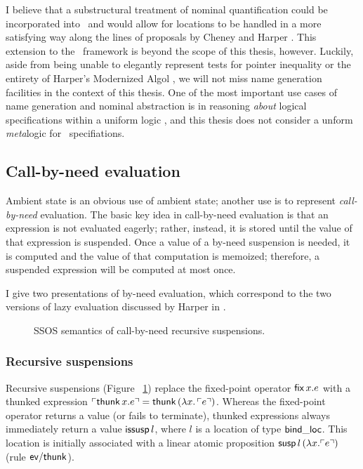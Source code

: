 I believe that a substructural treatment of nominal quantification
could be incorporated into \sls~and would allow for locations to be
handled in a more satisfying way along the lines of proposals by
Cheney and Harper \cite{cheney12dependent,harper12practical}. This
extension to the \sls~framework is beyond the scope of this thesis,
however. Luckily, aside from being unable to elegantly represent tests
for pointer inequality or the entirety of Harper's Modernized Algol
\cite[Chapter 35]{harper12practical}, we will not miss name generation
facilities in the context of this thesis. One of the most important
use cases of name generation and nominal abstraction is in reasoning
{\it about} logical specifications within a uniform logic
\cite{gacek11nominal}, and this thesis does not consider a unform {\it
  meta}logic for \sls~specifiations.

\subsection{Call-by-need evaluation}
\label{sec:call-by-need}

Ambient state is an obvious use of ambient state; another use is to
represent {\it call-by-need} evaluation. The basic key idea in
call-by-need evaluation is that an expression is not evaluated
eagerly; rather, instead, it is stored until the value of that
expression is suspended. Once a value of a by-need suspension is
needed, it is computed and the value of that computation is memoized;
therefore, a suspended expression will be computed at most once.

I give two presentations of by-need evaluation, which correspond to
the two versions of lazy evaluation discussed by Harper in
\cite[Chapter 37]{harper12practical}.



\begin{figure}[t]
\caption{SSOS semantics of call-by-need recursive suspensions.}
\label{fig:ssos-cbneed}
\end{figure}

\subsubsection{Recursive suspensions}


Recursive suspensions (Figure ~\ref{fig:ssos-cbneed}) replace the
fixed-point operator ${\sf fix}\,x.e$ with a thunked expression
${\ulcorner{{\sf thunk}\,x.e}\urcorner} = {\sf thunk}\,(\lambda
x.\,{\ulcorner{e}\urcorner})$. Whereas the fixed-point operator returns a value (or
fails to terminate), thunked expressions always immediately return a
value ${\sf issusp}\,l$, where $l$ is a location of type ${\sf
  bind\_loc}$. This location is initially associated with a linear
atomic proposition ${\sf susp}\,l\,(\lambda x.{\ulcorner{e}\urcorner})$ (rule ${\sf
  ev/thunk}$).

